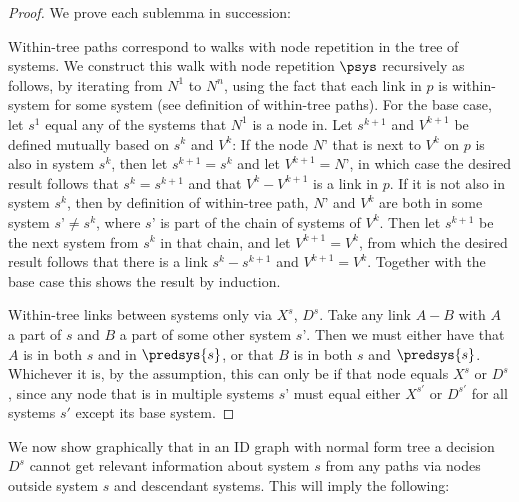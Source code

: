 \begin{proof} We prove each sublemma in succession:


 {Within-tree paths correspond to walks with node repetition in the tree of systems}.
We construct this walk with node repetition $\psys$ recursively as follows, by iterating from $N^1$ to $N^n$, using the fact that each link in $p$ is within-system for some system (see definition of within-tree paths). For the base case, let $s^1$ equal any of the systems that $N^1$ is a node in. Let $s^{k+1}$ and $V^{k+1}$ be defined mutually based on $s^{k}$ and $V^{k}$: If the node $N’$ that is next to $V^k$ on $p$ is also in system $s^k$, then let $s^{k+1}=s^k$ and let $V^{k+1}=N’$, in which case the desired result follows that $s^k=s^{k+1}$ and that $V^{k} - V^{k+1}$ is a link in $p$. If it is not also in system $s^k$, then by definition of within-tree path, $N’$ and $V^k$ are both in some system $s’ \neq s^k$, where $s’$ is part of the chain of systems of $V^k$. Then let $s^{k+1}$ be the next system from $s^k$ in that chain, and let $V^{k+1}=V^k$, from which the desired result follows that there is a link $s^k-s^{k+1}$ and $V^{k+1}=V^k$. Together with the base case this shows the result by induction.~

 {Within-tree links between systems only via $X^s$, $D^s$}. 
Take any link $A - B$ with $A$ a part of $s$ and $B$ a part of some other system $s’$.
Then we must either have that $A$ is in both $s$ and in $\predsys{s}$, or that $B$ is in both $s$ and $\predsys{s}$. Whichever it is, by the \systemsAndPathsUniqueness assumption, this can only be if that node equals $X^s$ or $D^s$, since any node that is in multiple systems $s’$ must equal either $X^{s'}$ or $D^{s'}$ for all systems $s'$ except its base system.
\end{proof}








We now show graphically that in an ID graph with normal form tree a decision $D^s$ cannot get relevant information about system $s$ from any paths via nodes outside system $s$
and descendant systems. 
This will imply the following:


\graphKnowledgeLemma*
{}



